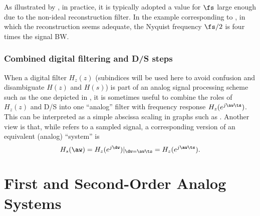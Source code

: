 As illustrated by , in practice, it is typically adopted a value for $\fs$ large enough due to the non-ideal reconstruction filter. In the example corresponding to , in which the reconstruction seems adequate, the Nyquist frequency $\fs/2$ is four times the signal BW.
\eExample 

\subsubsection{Combined digital filtering and D/S steps}

When a digital filter $H_z(z)$ (subindices will be used here to avoid confusion and disambiguate $H(z)$ and $H(s)$) is part of an analog signal processing scheme such as the one depicted in
 , it is sometimes useful to combine the roles of $H_z(z)$ and D/S into one
``analog'' filter with frequency response $H_z(e^{j \aw \ts})$. This can be interpreted as
a simple abscissa scaling in graphs such as . Another view is that,
while  refers to a sampled signal, a corresponding version
of an equivalent (analog) ``system'' is
\begin{equation}
H_s(\aw)  = H_z(e^{j \dw})|_{\dw = \aw \ts} = H_z(e^{j \aw \ts}).
\label{eq:digitalFilterAndDC}
\end{equation}

\section{{\akadvanced} First and Second-Order Analog Systems}


